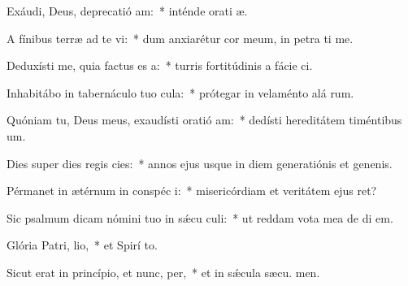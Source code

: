 \item Exáudi, Deus, deprecatió am:~* inténde orati æ.
\item A fínibus terræ ad te vi:~* dum anxiarétur cor meum, in petra ti me.
\item Deduxísti me, quia factus es  a:~* turris fortitúdinis a fácie ci.
\item Inhabitábo in tabernáculo tuo  cula:~* prótegar in velaménto alá rum.
\item Quóniam tu, Deus meus, exaudísti oratió am:~* dedísti hereditátem timéntibus  um.
\item Dies super dies regis cies:~* annos ejus usque in diem generatiónis et genenis.
\item Pérmanet in ætérnum in conspéc i:~* misericórdiam et veritátem ejus  ret?
\item Sic psalmum dicam nómini tuo in sǽcu culi:~* ut reddam vota mea de di  em.
\item Glória Patri,  lio,~* et Spirí to.
\item Sicut erat in princípio, et nunc,  per,~* et in sǽcula sæcu. men.
